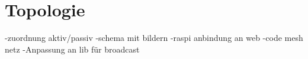\section{Topologie}
-zuordnung aktiv/passiv
-schema mit bildern
-raspi anbindung an web
-code mesh netz
-Anpassung an lib für broadcast
